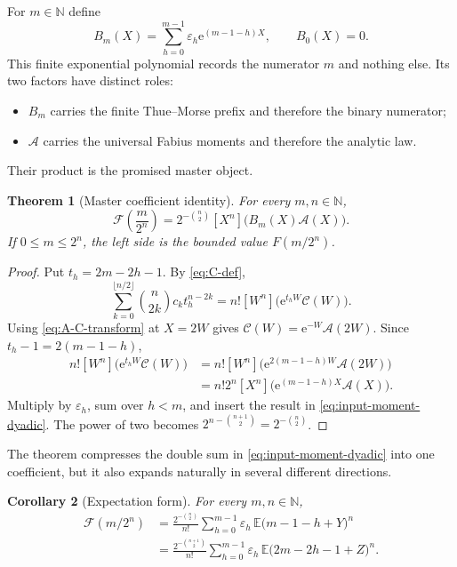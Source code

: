 \documentclass[11pt,oneside]{article}
\newtheorem{theorem}{Theorem}[section]
\newtheorem{corollary}[theorem]{Corollary}
\theoremstyle{definition}
\theoremstyle{remark}
\newcommand{\N}{\mathbb N}
\newcommand{\e}{\mathrm e}
\newcommand{\E}{\mathbb E}
\newcommand{\tm}{\varepsilon}
\begin{document}
For $m\in\N$ define
\begin{equation}
 B_m(X)=\sum_{h=0}^{m-1}\tm_h\e^{(m-1-h)X},
 \qquad B_0(X)=0.                                         \label{eq:Bm-def}
\end{equation}
This finite exponential polynomial records the numerator $m$ and nothing else.  Its two
factors have distinct roles:
\begin{itemize}
\item $B_m$ carries the finite Thue--Morse prefix and therefore the binary numerator;
\item $\mathscr A$ carries the universal Fabius moments and therefore the analytic law.
\end{itemize}
Their product is the promised master object.

\begin{theorem}[Master coefficient identity]
\label{thm:master-coefficient}
For every $m,n\in\N$,
\begin{equation}
 \boxed{
 \mathcal F\!\left(\frac{m}{2^n}\right)
 =2^{-\binom n2}[X^n]\bigl(B_m(X)\mathscr A(X)\bigr).}    \label{eq:master-coefficient}
\end{equation}
If $0\le m\le2^n$, the left side is the bounded value $F(m/2^n)$.
\end{theorem}

\begin{proof}
Put $t_h=2m-2h-1$.  By \eqref{eq:C-def},
\[
 \sum_{k=0}^{\lfloor n/2\rfloor}\binom n{2k}c_kt_h^{n-2k}
 =n![W^n]\bigl(\e^{t_hW}\mathscr C(W)\bigr).
\]
Using \eqref{eq:A-C-transform} at $X=2W$ gives
$\mathscr C(W)=\e^{-W}\mathscr A(2W)$.  Since $t_h-1=2(m-1-h)$,
\begin{align*}
 n![W^n]\bigl(\e^{t_hW}\mathscr C(W)\bigr)
 &=n![W^n]\bigl(\e^{2(m-1-h)W}\mathscr A(2W)\bigr)\\
 &=n!2^n[X^n]\bigl(\e^{(m-1-h)X}\mathscr A(X)\bigr).
\end{align*}
Multiply by $\tm_h$, sum over $h<m$, and insert the result in
\eqref{eq:input-moment-dyadic}.  The power of two becomes
$2^{n-\binom{n+1}{2}}=2^{-\binom n2}$.
\end{proof}

The theorem compresses the double sum in \eqref{eq:input-moment-dyadic} into one coefficient,
but it also expands naturally in several different directions.

\begin{corollary}[Expectation form]
\label{cor:expectation-dyadic}
For every $m,n\in\N$,
\begin{align}
 \mathcal F(m/2^n)
 &=\frac{2^{-\binom n2}}{n!}
   \sum_{h=0}^{m-1}\tm_h\,
   \E\bigl(m-1-h+Y\bigr)^n                              \label{eq:expectation-Y}\\
 &=\frac{2^{-\binom{n+1}{2}}}{n!}
   \sum_{h=0}^{m-1}\tm_h\,
   \E\bigl(2m-2h-1+Z\bigr)^n.                            \label{eq:expectation-Z}
\end{align}
\end{corollary}
\end{document}
